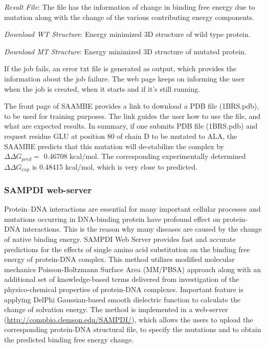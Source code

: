 \documentclass[9pt,tutorial]{livecoms}
\begin{document}
\textit{ Result File}: The file has the information of change in binding free energy due to mutation along with the change of the various contributing energy components.

\textit{Download WT Structure}: Energy minimized 3D structure of wild type protein.

\textit{Download MT Structure}: Energy minimized 3D structure of mutated protein.

If the job fails, an error txt file is generated as output, which provides the information about the job failure. The web page keeps on informing the user when the job is created, when it starts and if it’s still running.

The front page of SAAMBE provides a link to download a PDB file (1BRS.pdb), to be used for training purposes. The link guides the user how to use the file, and what are expected results. In summary, if one submits PDB file (1BRS.pdb) and request residue GLU at position 80 of chain D to be mutated to ALA, the SAAMBE predicts that this mutation will de-stabilize the complex by $ \Delta\Delta G_{pred} =$ 0.46708 kcal/mol. The corresponding experimentally determined $ \Delta\Delta G_{exp} $ is  0.48415 kcal/mol, which is very close to predicted.

\subsubsection{SAMPDI web-server}
Protein–DNA interactions are essential for many important cellular processes and mutations occurring in DNA-binding protein have profound effect on protein-DNA interactions. This is the reason why many diseases are caused by the change of native binding energy. SAMPDI\cite{peng2017predicting} Web Server provides fast and accurate predictions for the effects of single amino acid substitution on the binding free energy of protein-DNA complex. This method utilizes modified molecular mechanics Poisson-Boltzmann Surface Area (MM/PBSA) approach along with an additional set of knowledge-based terms delivered from investigation of the physico-chemical properties of protein-DNA complexes. Important feature is applying DelPhi Gaussian-based smooth dielectric function to calculate the change of solvation energy. The method is implemented in a web-server (\url{http://compbio.clemson.edu/SAMPDI/}), which allows the users to upload the corresponding protein-DNA structural file, to specify the mutations and to obtain the predicted binding free energy change.
\end{document}
